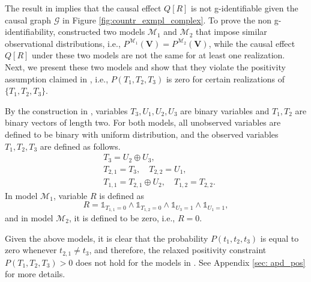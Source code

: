 \documentclass[accepted]{uai2022}
\newcommand{\V}[0]{\mathbf{V}}
\newcommand{\G}[0]{\mathcal{G}}
\newcommand{\M}[0]{\mathcal{M}}
\begin{document}
        The result in \cite{lee2019general} implies that the causal effect $Q[R]$ is not g-identifiable given the causal graph $\G$ in Figure \ref{fig:countr_exmpl_complex}. 
        To prove the non g-identifiability, \cite{lee2019general} constructed two models $\M_1$ and $\M_2$ that impose similar observational distributions, i.e., $P^{\M_1}(\V)=P^{\M_2}(\V)$, while the causal effect $Q[R]$ under these two models are not the same for at least one realization. 
        Next, we present these two models and show that they violate the positivity assumption claimed in \cite{shpitser2006identification}, i.e., $P(T_1,T_2,T_3)$ is zero for certain realizations of $\{T_1,T_2,T_3\}$.
        
        By the construction in \cite{lee2019general}, variables $T_3, U_1, U_2, U_3$ are binary variables and $T_1, T_2$ are binary vectors of length two. 
        For both models, all unobserved variables are defined to be binary with uniform distribution, and the observed variables $T_1, T_2, T_3$ are defined as follows.
        \begin{align*}
            &T_3 = U_2 \oplus U_3,\\
            &T_{2, 1} = T_3,\quad  T_{2, 2} = U_1,\\
            &T_{1, 1} = T_{2, 1}\oplus U_2,\quad T_{1, 2} = T_{2, 2}.  
        \end{align*}
        In model $\M_1$, variable $R$ is defined as
        \begin{equation*}
            R = \mathds{1}_{T_{1, 1} = 0} \wedge \mathds{1}_{T_{1, 2}=0} \wedge \mathds{1}_{U_3=1} \wedge \mathds{1}_{U_{1} = 1},
        \end{equation*}
        and in model $\M_2$, it is defined to be zero, i.e., $R = 0.$
        
        Given the above models, it is clear that the probability $P(t_1, t_2, t_3)$ is equal to zero whenever $t_{2,1}\neq t_3$, and therefore, the relaxed positivity constraint \mbox{$P(T_1, T_2, T_3)>0$} does not hold for the models in \cite{lee2019general}.
        See Appendix \ref{sec: apd_pos} for more details.
        
\end{document}
